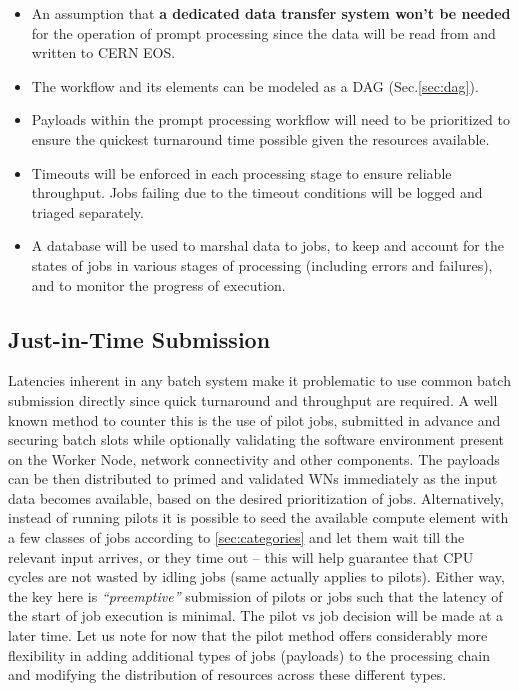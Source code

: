 \documentclass[pdftex,12pt,letter]{article}
\begin{document}
\begin{itemize}

\item An assumption that \textbf{a dedicated data transfer system won't be needed} for the
operation of prompt processing since the data will be read from and written to CERN EOS.

\item The workflow and its elements can be modeled as a DAG (Sec.\ref{sec:dag}).

\item Payloads within the prompt processing workflow will need to be prioritized to ensure
the quickest turnaround time possible given the resources available.

\item Timeouts will be enforced in each processing stage to ensure reliable throughput. Jobs
failing due to the timeout conditions will be logged and triaged separately.

\item A database will be used to marshal data to jobs, to keep and account for the states
of jobs in various stages of processing (including errors and failures), and to monitor the progress of execution.

\end{itemize}

\subsection{Just-in-Time Submission}
\label{sec:justintime}
Latencies inherent in any batch system make it problematic to use common batch submission directly
since quick turnaround and throughput are required. A well known method to counter this is the use
of pilot jobs, submitted in advance and securing batch slots while optionally validating the software
environment present on the Worker Node, network connectivity and other components. The
payloads can be then distributed to primed and validated WNs immediately as the input data becomes
available, based on the desired prioritization of jobs. Alternatively, instead of running pilots it is possible to
seed the available compute element with a few classes of jobs according to \ref{sec:categories} and
let them wait till the relevant input arrives, or they time out -- this will help guarantee that
CPU cycles are not wasted by idling jobs (same actually applies to pilots). Either way, the key
here is \textit{``preemptive''} submission of pilots or jobs such that the latency of the start of job
execution is minimal. The pilot vs job decision will be made at a later time. Let us note for now that
the pilot method offers considerably more flexibility in adding additional types of jobs (payloads)
to the processing chain and modifying the distribution of resources across these different types.
\end{document}
